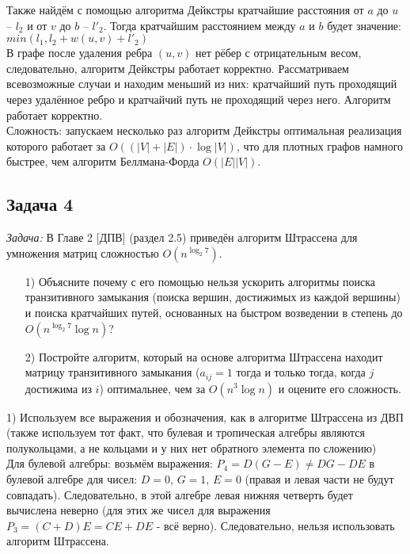 \documentclass[a4paper,12pt]{article} %
\begin{document}
Также найдём с помощью алгоритма Дейкстры кратчайшие расстояния от $ a $ до $ u $ -- $l_2$ и от $ v $ до $ b $ -- $ l'_2$. Тогда кратчайшим расстоянием между $ a $ и $ b $ будет значение:\\
$ min(l_1, l_2 + w(u,v) + l'_2) $\\

В графе после удаления ребра $ (u,v) $ нет рёбер с отрицательным весом, следовательно, алгоритм Дейкстры работает корректно. Рассматриваем всевозможные случаи и находим меньший из них: кратчайший путь проходящий через удалённое ребро и кратчайчий путь не проходящий через него. Алгоритм работает корректно.\\

Сложность: запускаем несколько раз алгоритм Дейкстры оптимальная реализация которого работает за $ O((|V|+|E|) \cdot \log |V|) $, что для плотных графов намного быстрее, чем алгоритм Беллмана-Форда $ O(|E||V|) $.


\subsection*{Задача 4}
\textit{Задача:} В Главе 2 [ДПВ] (раздел 2.5) приведён алгоритм Штрассена для умножения матриц сложностью $O(n^{\log_2 7})$.
\begin{itemize}
\item[1) ] Объясните почему с его помощью нельзя ускорить алгоритмы поиска транзитивного замыкания (поиска вершин, достижимых из каждой вершины) и поиска кратчайших путей, основанных на быстром возведении в степень до $O(n^{\log_2 7}\log n)$?
\item[2) ]  Постройте алгоритм, который на основе алгоритма Штрассена находит матрицу транзитивного замыкания ($a_{ij} = 1$ тогда и только тогда, когда $j$ достижима из $i$) оптимальнее, чем за $O(n^{3}\log n)$ и оцените его сложность.
\end{itemize}

1) Используем все выражения и обозначения, как в алгоритме Штрассена из ДВП (также используем тот факт, что булевая и тропическая алгебры являются полукольцами, а не кольцами и у них нет обратного элемента по сложению)\\

Для булевой алгебры: возьмём выражения: $ P_4 = D(G-E) \neq DG - DE $ в булевой алгебре для чисел: $ D = 0 $, $ G = 1 $, $ E = 0 $ (правая и левая части не будут совпадать). Следовательно, в этой алгебре левая нижняя четверть будет вычислена неверно (для этих же чисел для выражения $ P_3 = (C+D)E = CE+DE$ - всё верно). Следовательно, нельзя использовать алгоритм Штрассена.\\
\end{document}
